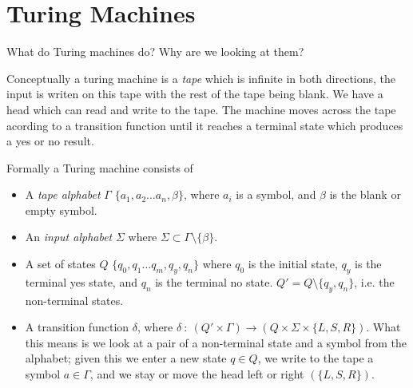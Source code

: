 \section{Turing Machines}
What do Turing machines do? Why are we looking at them?

Conceptually a turing machine is a \textit{tape} which is infinite in both directions,
the input is writen on this tape with the rest of the tape being blank. We have a head
which can read and write to the tape. The machine moves across the tape acording to
a transition function until it reaches a terminal state which produces a yes or no result.

\begin{center}
\end{center}

\begin{definition}
	Formally a Turing machine consists of
	\begin{itemize}
		\item A \textit{tape alphabet} $\Gamma$ $\{a_1, a_2 \dots a_n, \beta\}$,
			where $a_i$ is a symbol, and $\beta$ is the blank or empty symbol.
		\item An \textit{input alphabet} $\Sigma$
			where $\Sigma \subset \Gamma \setminus \{\beta\}$.
		\item A set of states $Q$ $\{q_0, q_1 \dots q_m, q_y, q_n\}$ where $q_0$ is the
			initial state, $q_y$ is the terminal yes state, and $q_n$ is the terminal no state.
			$Q\prime = Q \setminus \{q_y,q_n\}$, i.e. the non-terminal states.
		\item A transition function $\delta$,
			where $\delta\ :\ (Q\prime \times \Gamma) \rightarrow
			(Q \times \Sigma \times \{L,S,R\})$.
			What this means is we look at a pair of a non-terminal state
			and a symbol from the alphabet;
			given this we enter a new state $q \in Q$,
			we write to the tape a symbol $a \in \Gamma$,
			and we stay or move the head left or right $(\{L,S,R\})$.
	\end{itemize}
\end{definition}

